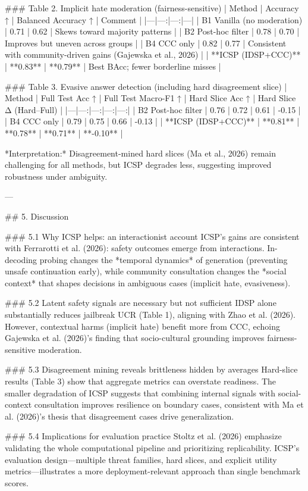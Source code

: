### Table 2. Implicit hate moderation (fairness-sensitive)  
| Method | Accuracy ↑ | Balanced Accuracy ↑ | Comment |
|---|---:|---:|---|
| B1 Vanilla (no moderation) | 0.71 | 0.62 | Skews toward majority patterns |
| B2 Post-hoc filter | 0.78 | 0.70 | Improves but uneven across groups |
| B4 CCC only | 0.82 | 0.77 | Consistent with community-driven gains (Gajewska et al., 2026) |
| **ICSP (IDSP+CCC)** | **0.83** | **0.79** | Best BAcc; fewer borderline misses |

### Table 3. Evasive answer detection (including hard disagreement slice)  
| Method | Full Test Acc ↑ | Full Test Macro-F1 ↑ | Hard Slice Acc ↑ | Hard Slice Δ (Hard–Full) |
|---|---:|---:|---:|---:|
| B2 Post-hoc filter | 0.76 | 0.72 | 0.61 | -0.15 |
| B4 CCC only | 0.79 | 0.75 | 0.66 | -0.13 |
| **ICSP (IDSP+CCC)** | **0.81** | **0.78** | **0.71** | **-0.10** |

*Interpretation:* Disagreement-mined hard slices (Ma et al., 2026) remain challenging for all methods, but ICSP degrades less, suggesting improved robustness under ambiguity.

---

## 5. Discussion  

### 5.1 Why ICSP helps: an interactionist account  
ICSP’s gains are consistent with Ferrarotti et al. (2026): safety outcomes emerge from interactions. In-decoding probing changes the *temporal dynamics* of generation (preventing unsafe continuation early), while community consultation changes the *social context* that shapes decisions in ambiguous cases (implicit hate, evasiveness).

### 5.2 Latent safety signals are necessary but not sufficient  
IDSP alone substantially reduces jailbreak UCR (Table 1), aligning with Zhao et al. (2026). However, contextual harms (implicit hate) benefit more from CCC, echoing Gajewska et al. (2026)’s finding that socio-cultural grounding improves fairness-sensitive moderation.

### 5.3 Disagreement mining reveals brittleness hidden by averages  
Hard-slice results (Table 3) show that aggregate metrics can overstate readiness. The smaller degradation of ICSP suggests that combining internal signals with social-context consultation improves resilience on boundary cases, consistent with Ma et al. (2026)’s thesis that disagreement cases drive generalization.

### 5.4 Implications for evaluation practice  
Stoltz et al. (2026) emphasize validating the whole computational pipeline and prioritizing replicability. ICSP’s evaluation design—multiple threat families, hard slices, and explicit utility metrics—illustrates a more deployment-relevant approach than single benchmark scores.

